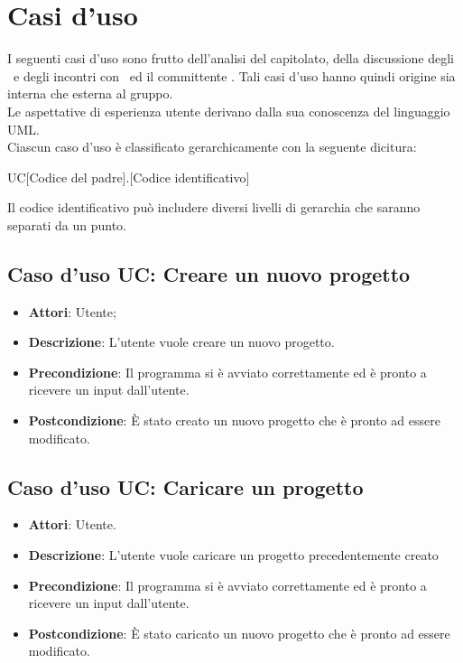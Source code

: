 \documentclass[../AnalisiDeiRequisiti.tex]{subfiles}
\begin{document}
	\section{Casi d'uso }
	I seguenti casi d'uso sono frutto dell'analisi del capitolato, della discussione degli
	\analisti\ e degli incontri con	\proponente\ ed il committente \vardanega.
	Tali casi d'uso hanno quindi origine sia interna che esterna al gruppo.\\
	Le aspettative di esperienza utente derivano dalla sua conoscenza del
	linguaggio UML.\\
	Ciascun caso d'uso è classificato gerarchicamente con la seguente dicitura:
	\begin{center}
		UC[Codice del padre].[Codice identificativo]
	\end{center}
	Il codice identificativo può includere diversi livelli di gerarchia che saranno
	separati da un punto.
	
	\subsection{Caso d'uso UC: Creare un nuovo progetto}
	\begin{itemize}
		\item \textbf{Attori}: Utente;
		\item \textbf{Descrizione}: L'utente vuole creare un nuovo progetto.
		\item \textbf{Precondizione}: Il programma si è avviato correttamente ed è pronto a ricevere un input dall'utente. 
		\item \textbf{Postcondizione}: È stato creato un nuovo progetto che è pronto ad essere modificato.
	\end{itemize}
	
	\subsection{Caso d'uso UC: Caricare un progetto}
	\begin{itemize}
		\item \textbf{Attori}: Utente. 
		\item \textbf{Descrizione}: L'utente vuole caricare un progetto precedentemente creato
		\item \textbf{Precondizione}: Il programma si è avviato correttamente ed è pronto a ricevere un input dall'utente.
		\item \textbf{Postcondizione}: È stato caricato un nuovo progetto che è pronto ad essere modificato.
	\end{itemize}
		
\end{document}
